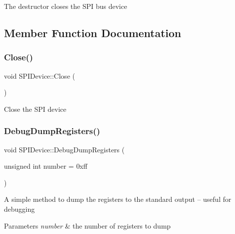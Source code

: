 The destructor closes the S\+PI bus device 

\subsection{Member Function Documentation}
\mbox{\label{classcubesat_1_1SPIDevice_a70a01bc99d4282619ade9c1a50e4dfe5}} 
\subsubsection{\texorpdfstring{Close()}{Close()}}
{\footnotesize\ttfamily void S\+P\+I\+Device\+::\+Close (\begin{DoxyParamCaption}{ }\end{DoxyParamCaption})\hspace{0.3cm}{\ttfamily [virtual]}}

Close the S\+PI device \mbox{\label{classcubesat_1_1SPIDevice_a5ae07bf0c830f2c05fc701bbb6a9ad1d}} 
\subsubsection{\texorpdfstring{Debug\+Dump\+Registers()}{DebugDumpRegisters()}}
{\footnotesize\ttfamily void S\+P\+I\+Device\+::\+Debug\+Dump\+Registers (\begin{DoxyParamCaption}\item[{unsigned int}]{number = {\ttfamily 0xff} }\end{DoxyParamCaption})\hspace{0.3cm}{\ttfamily [virtual]}}

A simple method to dump the registers to the standard output -- useful for debugging 
\begin{DoxyParams}{Parameters}
{\em number} & the number of registers to dump \\
\hline
\end{DoxyParams}
\mbox{\label{classcubesat_1_1SPIDevice_adfb4c589f0417f457e0fd1e4d6cf8364}} 
